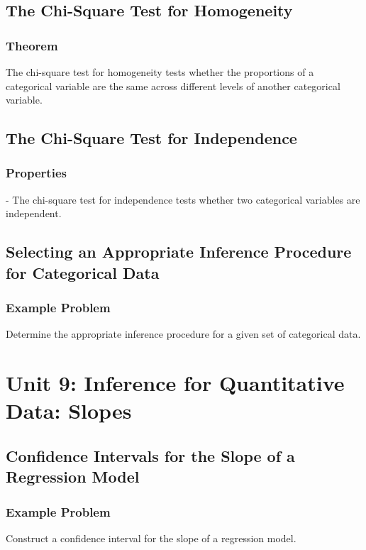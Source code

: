 \subsection{The Chi-Square Test for Homogeneity}
\subsubsection{Theorem}
\begin{theorem}
The chi-square test for homogeneity tests whether the proportions of a categorical variable are the same across different levels of another categorical variable.
\end{theorem}

\subsection{The Chi-Square Test for Independence}
\subsubsection{Properties}
\begin{properties}
- The chi-square test for independence tests whether two categorical variables are independent.
\end{properties}

\subsection{Selecting an Appropriate Inference Procedure for Categorical Data}
\subsubsection{Example Problem}
\begin{example}
Determine the appropriate inference procedure for a given set of categorical data.
\end{example}

\section{Unit 9: Inference for Quantitative Data: Slopes}
\subsection{Confidence Intervals for the Slope of a Regression Model}
\subsubsection{Example Problem}
\begin{example}
\raggedright
Construct a confidence interval for the slope of a regression model.
\end{example}

